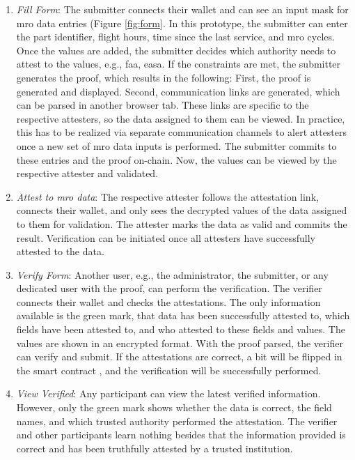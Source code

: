\begin{enumerate}
\item \textit{Fill Form}:
The submitter connects their wallet and can see an input mask for \acrshort{mro} data entries (Figure \ref{fig:form}. In this prototype, the submitter can enter the part identifier, flight hours, time since the last service, and \acrshort{mro} cycles. Once the values are added, the submitter decides which authority needs to attest to the values, e.g., \acrshort{faa}, \acrshort{easa}. If the constraints are met, the submitter generates the proof, which results in the following: First, the proof is generated and displayed. Second, communication links are generated, which can be parsed in another browser tab. These links are specific to the respective attesters, so the data assigned to them can be viewed. In practice, this has to be realized via separate communication channels to alert attesters once a new set of \acrshort{mro} data inputs is performed. The submitter commits to these entries and the proof on-chain. Now, the values can be viewed by the respective attester and validated.

\item \textit{Attest to \acrshort{mro} data}: The respective attester follows the attestation link, connects their wallet, and only sees the decrypted values of the data assigned to them for validation. The attester marks the data as valid and commits the result. Verification can be initiated once all attesters have successfully attested to the data.

\item \textit{Verify Form}: Another user, e.g., the administrator, the submitter, or any dedicated user with the proof, can perform the verification. The verifier connects their wallet and checks the attestations. The only information available is the green mark, that data has been successfully attested to, which fields have been attested to, and who attested to these fields and values. The values are shown in an encrypted format. With the proof parsed, the verifier can verify and submit. If the attestations are correct, a bit will be flipped in the smart contract \citep{zkdocs}, and the verification will be successfully performed.

\item \textit{View Verified}: Any participant can view the latest verified information. However, only the green mark shows whether the data is correct, the field names, and which trusted authority performed the attestation. The verifier and other participants learn nothing besides that the information provided is correct and has been truthfully attested by a trusted institution.
\end{enumerate}

